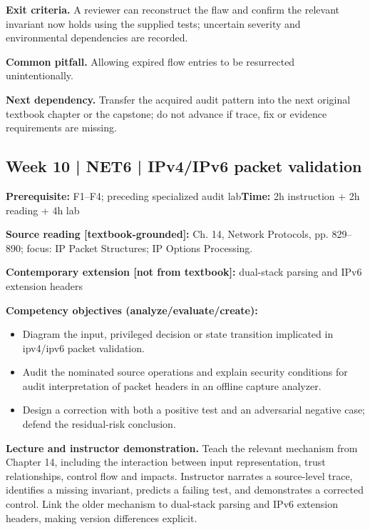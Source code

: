 \documentclass[10pt,letterpaper]{article}
\begin{document}
\textbf{Exit criteria.} A reviewer can reconstruct the flaw and confirm the relevant invariant now holds using the supplied tests; uncertain severity and environmental dependencies are recorded.

\textbf{Common pitfall.} Allowing expired flow entries to be resurrected unintentionally.

\textbf{Next dependency.} Transfer the acquired audit pattern into the next original textbook chapter or the capstone; do not advance if trace, fix or evidence requirements are missing.

\subsection{Week 10 | NET6 | IPv4/IPv6 packet validation}
\textbf{Prerequisite:} F1--F4; preceding specialized audit lab\hfill\textbf{Time:} 2h instruction + 2h reading + 4h lab

\textbf{Source reading [textbook-grounded]:} Ch. 14, Network Protocols, pp. 829--890; focus: IP Packet Structures; IP Options Processing.

\textbf{Contemporary extension [not from textbook]:} dual-stack parsing and IPv6 extension headers

\textbf{Competency objectives (analyze/evaluate/create):}
\begin{itemize}[leftmargin=*,itemsep=2pt]
\item Diagram the input, privileged decision or state transition implicated in ipv4/ipv6 packet validation.
\item Audit the nominated source operations and explain security conditions for audit interpretation of packet headers in an offline capture analyzer.
\item Design a correction with both a positive test and an adversarial negative case; defend the residual-risk conclusion.
\end{itemize}
\textbf{Lecture and instructor demonstration.} Teach the relevant mechanism from Chapter 14, including the interaction between input representation, trust relationships, control flow and impacts. Instructor narrates a source-level trace, identifies a missing invariant, predicts a failing test, and demonstrates a corrected control. Link the older mechanism to dual-stack parsing and IPv6 extension headers, making version differences explicit.
\end{document}
